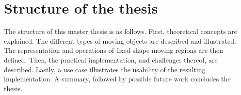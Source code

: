 
\section{Structure of the thesis}

The structure of this master thesis is as follows. First, theoretical concepts are explained. The different types of moving objects are described and illustrated. The representation and operations of fixed-shape moving regions are then defined. Then, the practical implementation, and challenges thereof, are described. Lastly, a use case illustrates the usability of the resulting implementation. A summary, followed by possible future work concludes the thesis.

